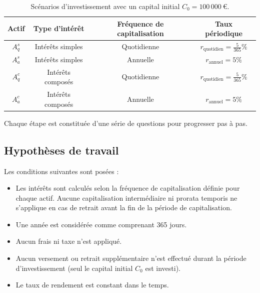 \documentclass{article}
\begin{document}
    \begin{table}[h!]
        \centering
        \begin{tabular}{|c|c|c|c|}
            \hline
            \textbf{Actif} & \textbf{Type d'intérêt} & \textbf{Fréquence de capitalisation} & \textbf{Taux périodique}                \\
            \hline
            \(A_q^s\)      & Intérêts simples        & Quotidienne                           & \(r_\text{quotidien} = \frac{5}{365}\%\) \\
            \hline
            \(A_a^s\)      & Intérêts simples        & Annuelle                              & \(r_\text{annuel} = 5\%\)                \\
            \hline
            \(A_q^c\)      & Intérêts composés      & Quotidienne                           & \(r_\text{quotidien} = \frac{5}{365}\%\) \\
            \hline
            \(A_a^c\)      & Intérêts composés      & Annuelle                              & \(r_\text{annuel} = 5\%\)                \\
            \hline
        \end{tabular}
        \caption{Scénarios d'investissement avec un capital initial \(C_0 = 100\,000\ \text{€}\).}
        \label{tab:scenarios}
    \end{table}

    Chaque étape est constituée d'une série de questions pour progresser pas à pas.

    \subsection{Hypothèses de travail}
        Les conditions suivantes sont posées :
        \begin{itemize}
        \item Les intérêts sont calculés selon la fréquence de capitalisation définie pour chaque actif. Aucune capitalisation intermédiaire ni prorata temporis ne s'applique en cas de retrait avant la fin de la période de capitalisation.
        \item Une année est considérée comme comprenant 365 jours.
        \item Aucun frais ni taxe n'est appliqué.
        \item Aucun versement ou retrait supplémentaire n’est effectué durant la période d'investissement (seul le capital initial \( C_0 \) est investi).
        \item Le taux de rendement est constant dans le temps.
        \end{itemize}
\end{document}
